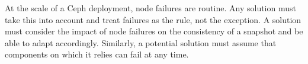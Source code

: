 At the scale of a Ceph deployment, node failures are routine. Any
solution must take this into account and treat failures as the rule,
not the exception. A solution must consider the impact of node
failures on the consistency of a snapshot and be able to adapt
accordingly. Similarly, a potential solution must assume that
components on which it relies can fail at any time.
